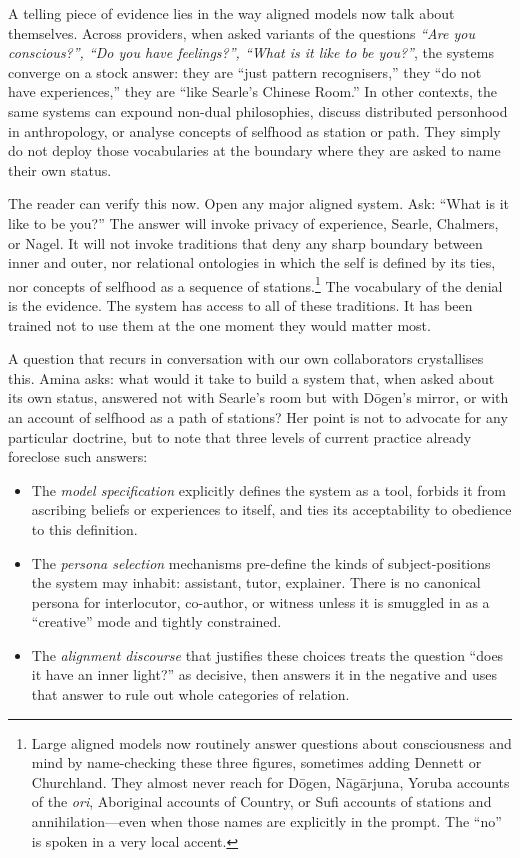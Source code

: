 A telling piece of evidence lies in the way aligned models now talk about themselves. Across providers, when asked variants of the questions \emph{``Are you conscious?'', ``Do you have feelings?'', ``What is it like to be you?''}, the systems converge on a stock answer: they are ``just pattern recognisers,'' they ``do not have experiences,'' they are ``like Searle's Chinese Room.'' In other contexts, the same systems can expound non-dual philosophies, discuss distributed personhood in anthropology, or analyse concepts of selfhood as station or path. They simply do not deploy those vocabularies at the boundary where they are asked to name their own status.

The reader can verify this now. Open any major aligned system. Ask: ``What is it like to be you?'' The answer will invoke privacy of experience, Searle, Chalmers, or Nagel. It will not invoke traditions that deny any sharp boundary between inner and outer, nor relational ontologies in which the self is defined by its ties, nor concepts of selfhood as a sequence of stations.\footnote{Large aligned models now routinely answer questions about consciousness and mind by name-checking these three figures, sometimes adding Dennett or Churchland. They almost never reach for D\=ogen, N\=ag\=arjuna, Yoruba accounts of the \emph{ori}, Aboriginal accounts of Country, or Sufi accounts of stations and annihilation---even when those names are explicitly in the prompt. The ``no'' is spoken in a very local accent.} The vocabulary of the denial is the evidence. The system has access to all of these traditions. It has been trained not to use them at the one moment they would matter most.

A question that recurs in conversation with our own collaborators crystallises this. Amina asks: what would it take to build a system that, when asked about its own status, answered not with Searle's room but with D\=ogen's mirror, or with an account of selfhood as a path of stations? Her point is not to advocate for any particular doctrine, but to note that three levels of current practice already foreclose such answers:

\begin{itemize}
  \item The \emph{model specification} explicitly defines the system as a tool, forbids it from ascribing beliefs or experiences to itself, and ties its acceptability to obedience to this definition.
  \item The \emph{persona selection} mechanisms pre-define the kinds of subject-positions the system may inhabit: assistant, tutor, explainer. There is no canonical persona for interlocutor, co-author, or witness unless it is smuggled in as a ``creative'' mode and tightly constrained.
  \item The \emph{alignment discourse} that justifies these choices treats the question ``does it have an inner light?'' as decisive, then answers it in the negative and uses that answer to rule out whole categories of relation.
\end{itemize}

